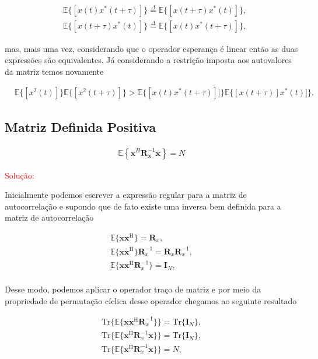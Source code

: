         \begin{align}
            &\mathbb{E}\{[x(t)x^{*}(t + \tau)]\} \overset{\Delta}{=} \mathbb{E}\{[x(t + \tau)x^{*}(t)]\}, \\
            &\mathbb{E}\{[x(t + \tau)x^{*}(t)]\} \overset{\Delta}{=} \mathbb{E}\{[x(t)x^{*}(t + \tau)]\},
        \end{align}
        
        mas, mais uma vez, considerando que o operador esperança é linear então as duas expressões são equivalentes. Já considerando a
        restrição imposta aos autovalores da matriz temos novamente
        
        \begin{align}
            &\mathbb{E}\{[x^{2}(t)]\} \mathbb{E}\{[x^{2}(t + \tau)]\} > \mathbb{E}\{[x(t)x^{*}(t + \tau)]]\}  \mathbb{E}\{[x(t + \tau)]x^{*}(t)]\}.
        \end{align}
    

\subsection{Matriz Definida Positiva} %

\begin{align}
    \mathbb{E}\left\{\mathbf{x}^H \mathbf{R}_{\mathbf{x}}^{-1} \mathbf{x} \right\} = N
\end{align}

\textcolor{red}{Solução:}

Inicialmente podemos escrever a expressão regular para a matriz de autocorrelação e supondo que de fato existe uma inversa bem definida 
para a matriz de autocorrelação

\begin{align}
    \mathbb{E}\{\mathbf{x} \mathbf{x}^{\text{H}}\} = \mathbf{R}_{x}, \\
    \mathbb{E}\{\mathbf{x} \mathbf{x}^{\text{H}}\}\mathbf{R}^{-1}_{x} = \mathbf{R}_{x}\mathbf{R}^{-1}_{x}, \\
    \mathbb{E}\{\mathbf{x} \mathbf{x}^{\text{H}}\mathbf{R}^{-1}_{x}\} = \mathbf{I}_{N}, \\
\end{align}

Desse modo, podemos aplicar o operador traço de matriz e por meio da propriedade de permutação cíclica desse operador chegamos ao seguinte resultado

\begin{align}
    \text{Tr}\{\mathbb{E}\{\mathbf{x} \mathbf{x}^{\text{H}}\mathbf{R}^{-1}_{x}\}\} = \text{Tr}\{\mathbf{I}_{N}\}, \\
    \text{Tr}\{\mathbb{E}\{\mathbf{x}^{\text{H}}\mathbf{R}^{-1}_{x} \mathbf{x}\}\} = \text{Tr}\{\mathbf{I}_{N}\}, \\
    \text{Tr}\{\mathbb{E}\{\mathbf{x}^{\text{H}}\mathbf{R}^{-1}_{x} \mathbf{x}\}\} = N,
\end{align}


